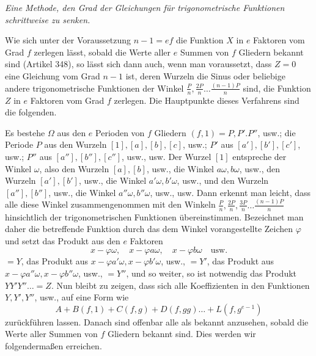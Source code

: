 \begin{center}\textit{Eine Methode, den Grad der Gleichungen für trigonometrische Funktionen schrittweise zu senken.}\end{center}


Wie sich unter der Voraussetzung \(n-1=ef\) die Funktion \(X\) in \(e\) Faktoren vom Grad \(f\) zerlegen lässt, sobald die Werte aller \(e\) Summen von \(f\) Gliedern bekannt sind (Artikel 348), so lässt sich dann auch, wenn man voraussetzt, dass \(Z=0\) eine Gleichung vom Grad \(n-1\) ist, deren Wurzeln die Sinus oder beliebige andere trigonometrische Funktionen der Winkel \(\frac Pn,\allowbreak \frac{2P}n\ldots\frac{(n-1)P}n\) sind, die Funktion \(Z\) in \(e\) Faktoren vom Grad \(f\) zerlegen. Die Hauptpunkte dieses Verfahrens sind die folgenden.

Es bestehe \(\Omega\) aus den \(e\) Perioden von \(f\) Gliedern \((f,1)=P,\allowbreak P'.P''\), usw.; die Periode \(P\) aus den Wurzeln \([1],\allowbreak [a],\allowbreak [b],\allowbreak [c]\), usw.; \(P'\) aus \([a'],\allowbreak [b'],\allowbreak [c']\), usw.; \(P''\) aus \([a''],\allowbreak [b''],\allowbreak [c'']\), usw., usw. Der Wurzel \([1]\) entspreche der Winkel \(\omega\), also den Wurzeln \([a],\allowbreak [b]\), usw., die Winkel \(a\omega,\allowbreak b\omega\), usw., den Wurzeln \([a'],\allowbreak [b']\), usw., die Winkel \(a'\omega,\allowbreak b'\omega\), usw., und den Wurzeln \([a''],\allowbreak [b'']\), usw., die Winkel \(a''\omega,\allowbreak b''\omega\), usw., usw. Dann erkennt man leicht, dass alle diese Winkel zusammengenommen mit den Winkeln \(\frac Pn,\allowbreak \frac{2P}n,\allowbreak \frac{3P}n\ldots\frac{(n-1)P}n\) hinsichtlich der trigonometrischen Funktionen übereinstimmen. Bezeichnet man daher die betreffende Funktion durch das dem Winkel vorangestellte Zeichen \(\varphi\) und setzt das Produkt aus den \(e\) Faktoren \[x-\varphi\omega,\quad x-\varphi a\omega,\quad x-\varphi b\omega\quad\text{usw.}\] \(=Y\), das Produkt aus \(x-\varphi a'\omega,\allowbreak x-\varphi b'\omega\), usw., \(=Y'\), das Produkt aus \(x-\varphi a''\omega,\allowbreak x-\varphi b''\omega\), usw., \(=Y''\), und so weiter, so ist notwendig das Produkt \(YY'Y''\ldots=Z\). Nun bleibt zu zeigen, dass sich alle Koeffizienten in den Funktionen \(Y,\allowbreak Y',\allowbreak Y''\), usw., auf eine Form wie
\[A+B(f,1)+C(f,g)+D(f,gg)\ldots+L(f,g^{e-1})\] zurückführen lassen. Danach sind offenbar alle als bekannt anzusehen, sobald die Werte aller Summen von \(f\) Gliedern bekannt sind. Dies werden wir folgendermaßen erreichen.

